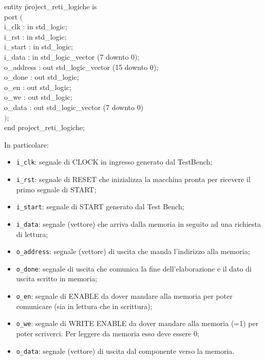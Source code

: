 \documentclass[12pt, table, xcdraw]{article}
\begin{document}
\begin{tabbing}
entity \= project\_reti\_logiche is \\
	\> port $($ \= \\
		\>\> i\_clk : in std\_logic; \\
		\>\> i\_rst : in std\_logic; \\
		\>\> i\_start : in std\_logic; \\ 
		\>\> i\_data : in std\_logic\_vector (7 downto 0); \\ 
		\>\> o\_address : out std\_logic\_vector (15 downto 0); \\ 
		\>\> o\_done : out std\_logic; \\
		\>\> o\_en : out std\_logic; \\ 
		\>\> o\_we : out std\_logic; \\ 
		\>\> o\_data : out std\_logic\_vector (7 downto 0) \\
	\>$)$; \\
end project\_reti\_logiche; \\

\end{tabbing}
In particolare:
\begin{itemize}
\item \texttt{i\_clk}: segnale di CLOCK in ingresso generato dal TestBench;
\item \texttt{i\_rst}: segnale di RESET che inizializza la macchina pronta per ricevere il primo
segnale di START;
\item \texttt{i\_start}: segnale di START generato dal Test Bench;
\item \texttt{i\_data}: segnale (vettore) che arriva dalla memoria in seguito ad una richiesta di
lettura;
\item \texttt{o\_address}: segnale (vettore) di uscita che manda l’indirizzo alla memoria;
\item \texttt{o\_done}: segnale di uscita che comunica la fine dell’elaborazione e il dato di uscita
scritto in memoria;
\item \texttt{o\_en}: segnale di ENABLE da dover mandare alla memoria per poter comunicare
(sia in lettura che in scrittura);
\item \texttt{o\_we}: segnale di WRITE ENABLE da dover mandare alla memoria (=1) per poter
scriverci. Per leggere da memoria esso deve essere 0;
\item \texttt{o\_data}: segnale (vettore) di uscita dal componente verso la memoria.
\end{itemize}
\end{document}
